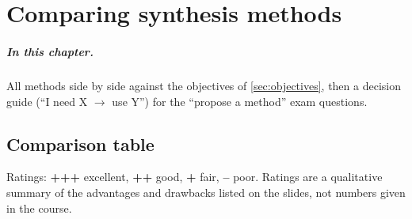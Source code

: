 \chapter{Comparing synthesis methods}
\label{ch:synth-compare}

\paragraph{In this chapter.} All methods side by side against the objectives of \cref{sec:objectives}, then a decision
guide (``I need X $\to$ use Y'') for the ``propose a method'' exam questions.

\section{Comparison table}
Ratings: \textbf{+++} excellent, \textbf{++} good, \textbf{+} fair, \textbf{--} poor. Ratings are a qualitative
summary of the advantages and drawbacks listed on the slides, not numbers given in the course.

